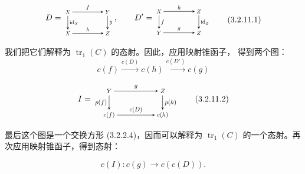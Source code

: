 \begin{equation}
  \begin{gathered}
  D=
  \begin{tikzpicture}[>=stealth,baseline=(current bounding box.center),scale=0.68,
    every node/.style={transform shape}]
    \node (X1) at (0,1.35) {$X$}; \node (Y) at (2.5,1.35) {$Y$};
    \node (X2) at (0,0) {$X$}; \node (Z) at (2.5,0) {$Z$};
    \draw[->] (X1) -- node[above] {$f$} (Y);
    \draw[->] (X1) -- node[right] {$\operatorname{id}_X$} (X2);
    \draw[->] (Y) -- node[right] {$g$} (Z);
    \draw[->] (X2) -- node[above] {$h$} (Z);
  \end{tikzpicture},
  \qquad
  D'=
  \begin{tikzpicture}[>=stealth,baseline=(current bounding box.center),scale=0.68,
    every node/.style={transform shape}]
    \node (X) at (0,1.35) {$X$}; \node (Z1) at (2.5,1.35) {$Z$};
    \node (Y) at (0,0) {$Y$}; \node (Z2) at (2.5,0) {$Z$};
    \draw[->] (X) -- node[above] {$h$} (Z1);
    \draw[->] (X) -- node[right] {$f$} (Y);
    \draw[->] (Z1) -- node[right] {$\operatorname{id}_Z$} (Z2);
    \draw[->] (Y) -- node[above] {$g$} (Z2);
  \end{tikzpicture}
  \end{gathered}
  \tag{3.2.11.1}
\end{equation}

我们把它们解释为 $\operatorname{tr}_1(C)$ 的态射。因此，应用映射锥函子，
得到两个图：
\[
  c(f)\xrightarrow{c(D)}c(h)\xrightarrow{c(D')}c(g)
\]

\begin{equation}
  I=
  \begin{tikzpicture}[>=stealth,baseline=(current bounding box.center),scale=0.76,
    every node/.style={transform shape}]
    \node (Y) at (0,1.35) {$Y$}; \node (Z) at (3.0,1.35) {$Z$};
    \node (Cf) at (0,0) {$c(f)$}; \node (Ch) at (3.0,0) {$c(h)$};
    \draw[->] (Y) -- node[above] {$g$} (Z);
    \draw[->] (Y) -- node[left] {$p(f)$} (Cf);
    \draw[->] (Z) -- node[right] {$p(h)$} (Ch);
    \draw[->] (Cf) -- node[above] {$c(D)$} (Ch);
  \end{tikzpicture}
  \tag{3.2.11.2}
\end{equation}

最后这个图是一个交换方形 (3.2.2.4)，因而可以解释为
$\operatorname{tr}_1(C)$ 的一个态射。再次应用映射锥函子，得到态射：

\begin{equation}
  c(I)\colon c(g)\longrightarrow c(c(D)).
  \tag{3.2.11.3}
\end{equation}
\endgroup
